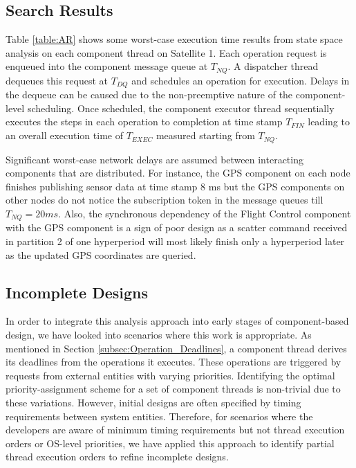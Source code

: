 \subsection{Search Results}

Table \ref{table:AR} shows some worst-case execution time results from state space analysis on each component thread on Satellite 1. Each operation request is enqueued into the component message queue at $T_{NQ}$. A dispatcher thread dequeues this request at $T_{DQ}$ and schedules an operation for execution. Delays in the dequeue can be caused due to the non-preemptive nature of the component-level scheduling. Once scheduled, the component executor thread sequentially executes the steps in each operation to completion at time stamp $T_{FIN}$ leading to an overall execution time of $T_{EXEC}$ measured starting from $T_{NQ}$. 

Significant worst-case network delays are assumed between interacting components that are distributed. For instance, the GPS component on each node finishes publishing sensor data at time stamp 8 ms but the GPS components on other nodes do not notice the subscription token in the message queues till $T_{NQ} = 20 ms$. Also, the synchronous dependency of the Flight Control component with the GPS component is a sign of poor design as a scatter command received in partition 2 of one hyperperiod will most likely finish only a hyperperiod later as the updated GPS coordinates are queried. 

\subsection{Incomplete Designs}

In order to integrate this analysis approach into early stages of component-based design, we have looked into scenarios where this work is appropriate. As mentioned in Section \ref{subsec:Operation_Deadlines}, a component thread derives its deadlines from the operations it executes. These operations are triggered by requests from external entities with varying priorities. Identifying the optimal priority-assignment scheme for a set of component threads is non-trivial due to these variations. However, initial designs are often specified by timing requirements between system entities. Therefore, for scenarios where the developers are aware of minimum timing requirements but not thread execution orders or OS-level priorities, we have applied this approach to identify partial thread execution orders to refine incomplete designs. 


